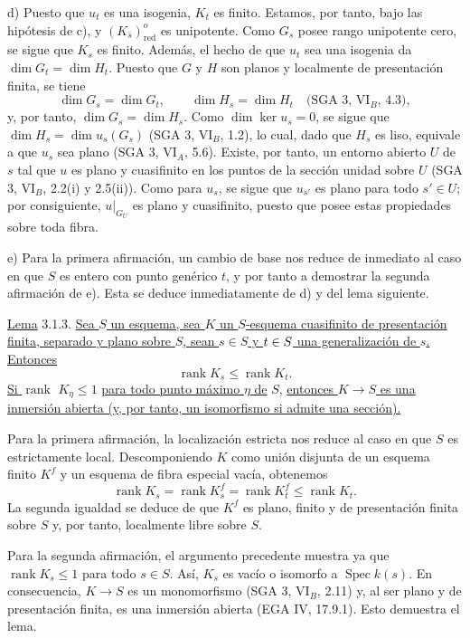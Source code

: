 \smallskip
\noindent
d) Puesto que $u_t$ es una isogenia, $K_t$ es finito. Estamos, por
tanto, bajo las hipótesis de c), y $(K_{\bar s})^o_{\mathrm{red}}$ es
unipotente. Como $G_s$ posee rango unipotente cero, se sigue que $K_s$
es finito. Además, el hecho de que $u_t$ sea una isogenia da
$\dim G_t=\dim H_t$. Puesto que $G$ y $H$ son planos y localmente de
presentación finita, se tiene
\[
 \dim G_s=\dim G_t,\qquad \dim H_s=\dim H_t
 \quad\text{(SGA 3, VI$_B$, 4.3)},
\]
y, por tanto, $\dim G_s=\dim H_s$. Como $\dim\ker u_s=0$, se sigue que
$\dim H_s=\dim u_s(G_s)$ (SGA 3, VI$_B$, 1.2), lo cual, dado que $H_s$
es liso, equivale a que $u_s$ sea plano (SGA 3, VI$_A$, 5.6). Existe,
por tanto, un entorno abierto $U$ de $s$ tal que $u$ es plano y
cuasifinito en los puntos de la sección unidad sobre $U$ (SGA 3,
VI$_B$, 2.2(i) y 2.5(ii)). Como para $u_s$, se sigue que $u_{s'}$ es
plano para todo $s'\in U$; por consiguiente, $u|_{G_U}$ es plano y
cuasifinito, puesto que posee estas propiedades sobre toda fibra.

\smallskip
\noindent
e) Para la primera afirmación, un cambio de base nos reduce de inmediato
al caso en que $S$ es entero con punto genérico $t$, y por tanto a
demostrar la segunda afirmación de e). Esta se deduce inmediatamente
de d) y del lema siguiente.

\medskip
\noindent
\underline{Lema} 3.1.3. \underline{Sea $S$ un esquema, sea $K$ un
$S$-esquema cuasifinito de presentación finita, separado y plano sobre
$S$, sean $s\in S$ y $t\in\sisi{T}{S}$ una generalización de $s$. Entonces}
\[
 \operatorname{rank}K_s\leq \operatorname{rank}K_t.
\]
\underline{Si $\operatorname{rank}$} $K_\eta\leq1$ \underline{para todo punto máximo
$\eta$ de} $S$, \underline{entonces $K\longrightarrow S$ es una inmersión abierta
(y, por tanto, un isomorfismo si admite una sección).}

Para la primera afirmación, la localización estricta nos reduce al caso
en que $S$ es estrictamente local. Descomponiendo $K$ como unión
disjunta de un esquema finito $K^f$ y un esquema de fibra especial
vacía, obtenemos
\[
 \operatorname{rank}K_s
 =\operatorname{rank}K^f_s
 =\operatorname{rank}K^f_t
 \leq\operatorname{rank}K_t.
\]
La segunda igualdad se deduce de que $K^f$ es plano, finito y de
presentación finita sobre $S$ y, por tanto, localmente libre sobre $S$.

Para la segunda afirmación, el argumento precedente muestra ya que
$\operatorname{rank}K_s\leq1$ para todo $s\in S$. Así, $K_s$ es vacío
o isomorfo a $\operatorname{Spec}k(s)$. En consecuencia,
$K\longrightarrow S$ es un monomorfismo (SGA 3, VI$_B$, 2.11) y, al
ser plano y de presentación finita, es una inmersión abierta
(EGA IV, 17.9.1). Esto demuestra el lema.

